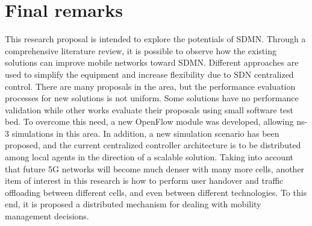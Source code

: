 \clearpage
\section{Final remarks}
\label{ch:remarks}

This research proposal is intended to explore the potentials of \acl{SDMN}. 
Through a comprehensive literature review, it is possible to observe how the
existing solutions can improve mobile networks toward \ac{SDMN}. Different
approaches are used to simplify the equipment and increase flexibility due to
\ac{SDN} centralized control.
There are many proposals in the area, but the performance evaluation processes
for new solutions is not uniform. Some solutions have no performance validation
while other works evaluate their proposals using small software test bed. To
overcome this need, a new OpenFlow module was developed, allowing \ac{ns-3}
simulations in this area. In addition, a new simulation scenario has been
proposed, and the current centralized controller architecture is to be
distributed among local agents in the direction of a scalable solution.
Taking into account that future 5G networks will become much denser with many
more cells, another item of interest in this research is how to perform user
handover and traffic offloading between different cells, and even between
different technologies. To this end, it is proposed a distributed mechanism for
dealing with mobility management decisions.

